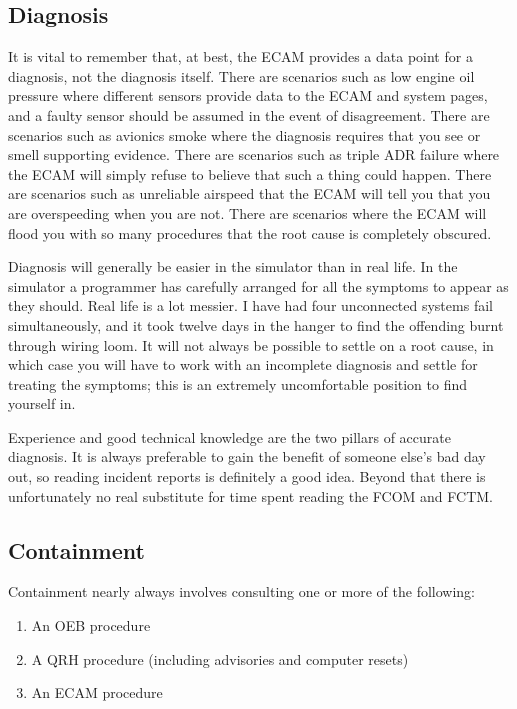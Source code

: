 \documentclass[a5paper,11pt,titlepage]{article}
\begin{document}
\subsection{Diagnosis}

It is vital to remember that, at best, the ECAM provides a data point
for a diagnosis, not the diagnosis itself. There are scenarios such as
low engine oil pressure where different sensors provide data to the ECAM
and system pages, and a faulty sensor should be assumed in the event of
disagreement. There are scenarios such as avionics smoke where the
diagnosis requires that you see or smell supporting evidence. There are
scenarios such as triple ADR failure where the ECAM will simply refuse
to believe that such a thing could happen. There are scenarios such as
unreliable airspeed that the ECAM will tell you that you are
overspeeding when you are not. There are scenarios where the ECAM will
flood you with so many procedures that the root cause is completely
obscured.

Diagnosis will generally be easier in the simulator than in real
life. In the simulator a programmer has carefully arranged for all the
symptoms to appear as they should. Real life is a lot messier. I have
had four unconnected systems fail simultaneously, and it took twelve
days in the hanger to find the offending burnt through wiring loom. It
will not always be possible to settle on a root cause, in which case you
will have to work with an incomplete diagnosis and settle for treating
the symptoms; this is an extremely uncomfortable position to find
yourself in.

Experience and good technical knowledge are the two pillars of accurate
diagnosis. It is always preferable to gain the benefit of someone else's
bad day out, so reading incident reports is definitely a good
idea. Beyond that there is unfortunately no real substitute for time
spent reading the FCOM and FCTM.

\subsection{Containment}

Containment nearly always involves consulting one or more of the
following:

\begin{enumerate}
\item An OEB procedure
\item A QRH procedure (including advisories and computer resets)
\item An ECAM procedure
\end{enumerate}
\end{document}
